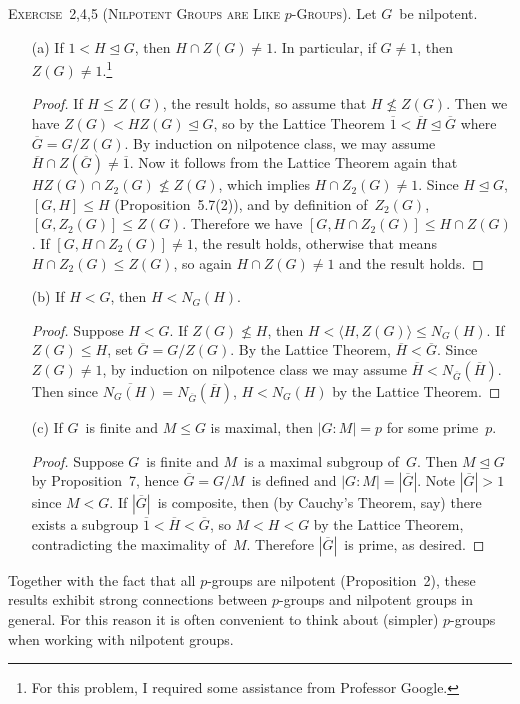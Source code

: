 \documentclass[letterpaper]{article}
\newcommand{\exercise}[1]{\goodbreak\noindent\textsc{Exercise~{#1}.}}
\newcommand{\sect}{\cap}
\newcommand{\subgroup}{\le}
\newcommand{\normal}{\trianglelefteq}
\newcommand{\res}[1]{\overline{#1}}
\newcommand{\ord}[1]{|{#1}|}
\newcommand{\gen}[1]{\langle{#1}\rangle}
\newcommand{\gindex}[2]{|{#1}:{#2}|}
\begin{document}
\exercise{2,4,5 (Nilpotent Groups are Like $p$-Groups)}
Let $G$~be nilpotent.
\begin{enumerate}[itemsep=0pt]
\item[(a)] If $1<H\normal G$, then $H\sect Z(G)\ne1$. In particular, if $G\ne1$, then $Z(G)\ne1$.\footnote{For this problem, I required some assistance from Professor Google.}
\begin{proof}
If $H\subgroup Z(G)$, the result holds, so assume that $H\not\subgroup Z(G)$. Then we have $Z(G)<HZ(G)\normal G$, so by the Lattice Theorem $\res{1}<\res{H}\normal\res{G}$ where $\res{G}=G/Z(G)$. By induction on nilpotence class, we may assume $\res{H}\sect Z(\res{G})\ne\res{1}$. Now it follows from the Lattice Theorem again that $HZ(G)\sect Z_2(G)\not\subgroup Z(G)$, which implies $H\sect Z_2(G)\ne1$. Since $H\normal G$, $[G,H]\subgroup H$ (Proposition~5.7(2)), and by definition of~$Z_2(G)$, $[G,Z_2(G)]\subgroup Z(G)$. Therefore we have $[G,H\sect Z_2(G)]\subgroup H\sect Z(G)$. If $[G,H\sect Z_2(G)]\ne1$, the result holds, otherwise that means $H\sect Z_2(G)\subgroup Z(G)$, so again $H\sect Z(G)\ne1$ and the result holds.
\end{proof}
\item[(b)] If $H<G$, then $H<N_G(H)$.
\begin{proof}
Suppose $H<G$. If $Z(G)\not\subgroup H$, then $H<\gen{H,Z(G)}\subgroup N_G(H)$. If $Z(G)\subgroup H$, set $\res{G}=G/Z(G)$. By the Lattice Theorem, $\res{H}<\res{G}$. Since $Z(G)\ne1$, by induction on nilpotence class we may assume $\res{H}<N_{\res{G}}(\res{H})$. Then since $\res{N_G(H)}=N_{\res{G}}(\res{H})$, $H<N_G(H)$ by the Lattice Theorem.
\end{proof}
\item[(c)] If $G$~is finite and $M\subgroup G$ is maximal, then $\gindex{G}{M}=p$ for some prime~$p$.
\begin{proof}
Suppose $G$~is finite and $M$~is a maximal subgroup of~$G$. Then $M\normal G$ by Proposition~7, hence $\res{G}=G/M$~is defined and $\gindex{G}{M}=\ord{\res{G}}$. Note $\ord{\res{G}}>1$ since $M<G$. If $\ord{\res{G}}$~is composite, then (by Cauchy's Theorem, say) there exists a subgroup $\res{1}<\res{H}<\res{G}$, so $M<H<G$ by the Lattice Theorem, contradicting the maximality of~$M$. Therefore $\ord{\res{G}}$~is prime, as desired.
\end{proof}
\end{enumerate}
\noindent Together with the fact that all $p$-groups are nilpotent (Proposition~2), these results exhibit strong connections between $p$-groups and nilpotent groups in general. For this reason it is often convenient to think about (simpler) $p$-groups when working with nilpotent groups.
\end{document}
